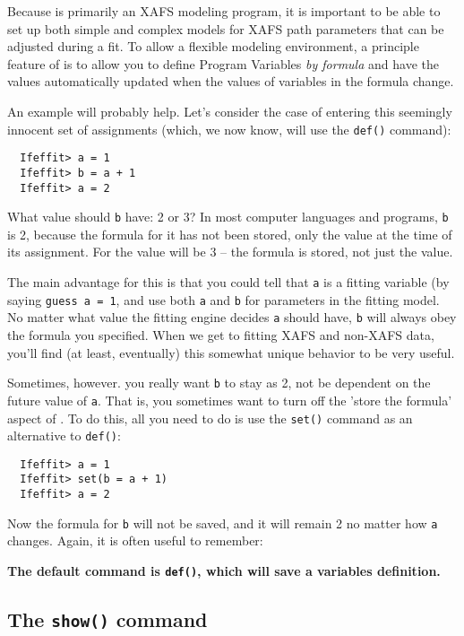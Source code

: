 \documentclass[11pt]{article}
\begin{document}
Because {\ifeffit} is primarily an XAFS modeling program, it is important
to be able to set up both simple and complex models for XAFS path
parameters that can be adjusted during a fit.  To allow a flexible
modeling environment, a principle feature of {\ifeffit} is to allow you to
define Program Variables {\emph{by formula}} and have the values
automatically updated when the values of variables in the formula change.

An example will probably help.  Let's consider the case of entering this
seemingly innocent set of assignments (which, we now know, will use the 
{\tt{def()}} command):
{\small\begin{verbatim}
  Ifeffit> a = 1
  Ifeffit> b = a + 1
  Ifeffit> a = 2
\end{verbatim}}\noindent
What value should {\tt{b}} have: 2 or 3?  In most computer languages and
programs, {\tt{b}} is 2, because the formula for it has not been stored,
only the value at the time of its assignment.  For {\ifeffit} the value
will be 3 -- the formula is stored, not just the value.

The main advantage for this is that you could tell {\ifeffit} that {\tt{a}}
is a fitting variable (by saying {\tt{guess a = 1}}, and use both {\tt{a}}
and {\tt{b}} for parameters in the fitting model.  No matter what value the
fitting engine decides {\tt{a}} should have, {\tt{b}} will always obey the
formula you specified.  When we get to fitting XAFS and non-XAFS data,
you'll find (at least, eventually) this somewhat unique behavior to be very
useful. 

Sometimes, however.  you really want {\tt{b}} to stay as 2, not be
dependent on the future value of {\tt{a}}.  That is, you sometimes want to
turn off the 'store the formula' aspect of {\ifeffit}.  To do this, all you
need to do is use the {\tt{set()}} command as an alternative to {\tt{def()}}:
{\small\begin{verbatim}
  Ifeffit> a = 1
  Ifeffit> set(b = a + 1)
  Ifeffit> a = 2
\end{verbatim}}\noindent
Now the formula for {\tt{b}} will not be saved, and it will remain 2 no
matter how {\tt{a}} changes.
Again, it is often useful to remember: 
\par\indent\indent 
{\bf The default command is {\tt{def()}}, which will save a variables definition.}


\subsection{The {\tt{show()}} command}
\label{s:datatypes:show}
\end{document}
